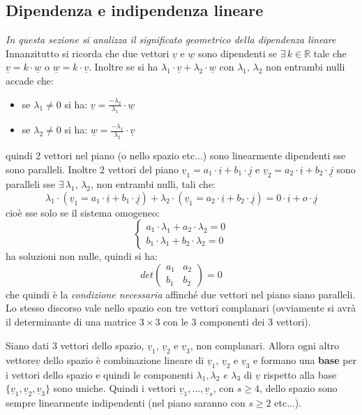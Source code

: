 \documentclass[a4paper,12pt, oneside]{book}
\begin{document}
\subsection{Dipendenza e indipendenza lineare}
\textit{In questa sezione si analizza il significato geometrico della dipendenza lineare}\\
Innanzitutto si ricorda che due vettori $\underline{v}$ e $\underline{w}$ sono dipendenti se $\exists \,k\in\mathbb{R}$ tale che $\underline{v}=k\cdot \underline{w}$ o $\underline{w}=k\cdot \underline{v}$. Inoltre se si ha $\lambda_1\cdot \underline{v}+\lambda_2\cdot \underline{w}$ con $\lambda_1,\,\lambda_2$ non entrambi nulli accade che:
\begin{itemize}
\item se $\lambda_1\neq 0$ si ha: $\underline{v}=\frac{-\lambda_2}{\lambda_1}\cdot \underline{w}$
\item se $\lambda_2\neq 0$ si ha: $\underline{w}=\frac{-\lambda_1}{\lambda_2}\cdot \underline{v}$
\end{itemize}
quindi 2 vettori nel piano (o nello spazio etc...) sono linearmente dipendenti sse sono paralleli.
Inoltre 2 vettori del piano $\underline{v}_1=a_1\cdot \underline{i}+b_1\cdot \underline{j}$ e $\underline{v}_2=a_2\cdot \underline{i}+b_2\cdot \underline{j}$ sono paralleli sse $\exists \,\lambda_1,\,\lambda_2$, non entrambi nulli, tali che:
$$\lambda_1\cdot (\underline{v}_1=a_1\cdot \underline{i}+b_1\cdot \underline{j})+\lambda_2\cdot (\underline{v}_1=a_2\cdot \underline{i}+b_2\cdot \underline{j})=0\cdot \underline{i}+o\cdot \underline{j}$$
cioè sse solo se il sistema omogeneo:
$$\begin{cases}
a_1\cdot \lambda_1+a_2\cdot \lambda_2=0\\
b_1\cdot \lambda_1+b_2\cdot \lambda_2=0
\end{cases}$$
ha soluzioni non nulle, quindi si ha:
$$
det\left(\begin{matrix}
a_1 & a_2\\
b_1 & b_2
\end{matrix}\right)=0
$$
che quindi è la\textit{ condizione necessaria} affinché due vettori nel piano siano paralleli.\\ Lo stesso discorso vale nello spazio con tre vettori complanari (ovviamente si avrà il determinante di una matrice $3\times 3$ con le 3 componenti dei 3 vettori).
\begin{teorema}
Siano dati 3 vettori dello spazio, $\underline{v}_1$, $\underline{v}_2$ e $\underline{v}_3$, non complanari. Allora ogni altro vettore$\underline{v}$ dello spazio è combinazione lineare di $\underline{v}_1$, $\underline{v}_2$ e $\underline{v}_3$ e formano una \textbf{base} per i vettori dello spazio e quindi le componenti $\lambda_1,\lambda_2\,\, e \,\, \lambda_3$ di $\underline{v}$ rispetto alla base $\{\underline{v}_1,\underline{v}_2,\underline{v}_3\}$ sono uniche. Quindi i vettori $\underline{v}_1,...,\underline{v}_s$, con $s\geq 4$, dello spazio sono sempre linearmente indipendenti (nel piano saranno con $s\geq 2$ etc...). 
\end{teorema}
\end{document}
